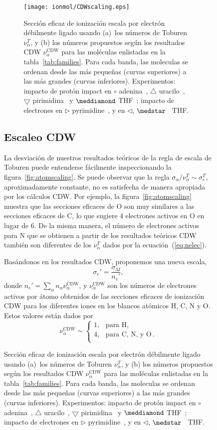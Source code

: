 \begin{figure}
\begin{figure}
\centering
\texttt{[image: ionmol/CDWscaling.eps]}
\caption[Sección eficaz de ionización por electrón débilmente ligado.]
{Sección eficaz de ionización escala por electrón débilmente ligado 
usando (a)~los números de Toburen $\nu_{\alpha}^T$, y (b) los
números propuestos según los resultados CDW $\nu_{\alpha}^{\text{CDW}}$ 
para las moléculas enlistadas en la tabla~\ref{tab:families}. 
Para cada banda, las moleculas se ordenan desde las más pequeñas (curvas
superiores) a las más grandes (curvas inferiores). Experimentos: 
impacto de protón impact en 
\mbox{\Large$\circ$} adenina~\cite{iriki2011}, 
$\triangle$ uracilo~\cite{itoh2013}, 
$\bigtriangledown$ pirimidina~\cite{wolff2014} y $\meddiamond$ 
THF~\cite{wang2016}; impacto de electrones en 
$\rhd$ pyrimidine~\cite{bug2017}, y en $\lhd$, 
$\medstar$~\cite{wolf2019,fuss2009} THF.}
\label{fig:newscaling}
\end{figure}

\subsection{Escaleo CDW}
\label{subsec:CDW}

La desviación de nuestros resultados teóricos de la regla de escala de 
Toburen puede entenderse fácilmente inspeccionando la
figura~\ref{fig:atomscaling}. Se puede observar que la regla 
$\sigma_{\alpha}/\nu_{\alpha}^T\sim \sigma_{e}^T$, aproximadamente 
constante, no es satisfecha de manera apropiada por los cálculos CDW. 
Por ejemplo, la figura~\ref{fig:atomscaling} muestra que las secciones
eficaces de O son muy similares a las secciones eficaces de C, lo que 
sugiere 4 electrones activos en O en lugar de 6. De la misma manera, el 
número de electrones activos para N que se obtienen a partir de los 
resultados teóricos CDW también son diferentes de los $\nu_{\alpha}^T$ 
dados por la ecuación~(\ref{eq:nelec}).

Basándonos en los resultados CDW, proponemos una nueva escala,
\begin{equation}
\sigma_{e}'=\frac{\sigma_M}{n_e'},
\label{32} 
\end{equation}
donde $n_e'=\sum_{\alpha}n_{\alpha}\nu_{\alpha}^{\text{CDW}}$, y
$\nu_{\alpha}^{\text{CDW}}$ son los números de electrones activos 
por átomo obtenidos de las secciones eficaces de ionización CDW para los 
diferentes iones en los blancos atómicos H, C, N y O. Estos valores están 
dados por
\begin{equation}
\nu_{\alpha }^{\text{CDW}} \sim\left\{ 
\begin{array}{ll}
1, & \text{para H,} \\
4, & \text{para C, N, y O}\,. \\ 
\end{array}
\right. 
\label{eq:scalingCDW}
\end{equation}


\end{figure}
